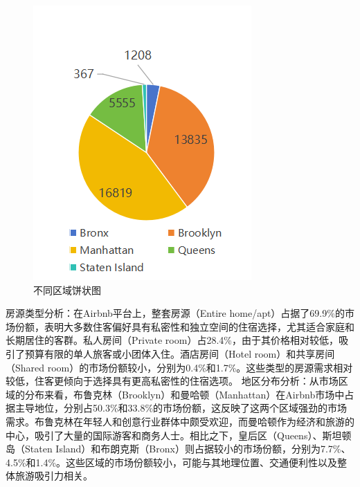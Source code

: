 \documentclass[12pt]{article}
\begin{document}
\begin{CJK}{UTF8}{gbsn}
\begin{figure}[H]
\begin{minipage}[b]{0.45\textwidth}
			\includegraphics[width=\linewidth]{pic/12.png}
			\caption{不同区域饼状图}
		\end{minipage}
		
	\end{figure}
	
	房源类型分析：在Airbnb平台上，整套房源（Entire home/apt）占据了69.9\%的市场份额，表明大多数住客偏好具有私密性和独立空间的住宿选择，尤其适合家庭和长期居住的客群。私人房间（Private room）占28.4\%，由于其价格相对较低，吸引了预算有限的单人旅客或小团体入住。酒店房间（Hotel room）和共享房间（Shared room）的市场份额较小，分别为0.4\%和1.7\%。这些类型的房源需求相对较低，住客更倾向于选择具有更高私密性的住宿选项。
	地区分布分析：从市场区域的分布来看，布鲁克林（Brooklyn）和曼哈顿（Manhattan）在Airbnb市场中占据主导地位，分别占50.3\%和33.8\%的市场份额，这反映了这两个区域强劲的市场需求。布鲁克林在年轻人和创意行业群体中颇受欢迎，而曼哈顿作为经济和旅游的中心，吸引了大量的国际游客和商务人士。相比之下，皇后区（Queens）、斯坦顿岛（Staten Island）和布朗克斯（Bronx）则占据较小的市场份额，分别为7.7\%、4.5\%和1.4\%。这些区域的市场份额较小，可能与其地理位置、交通便利性以及整体旅游吸引力相关。
	

\end{CJK}
\end{document}
